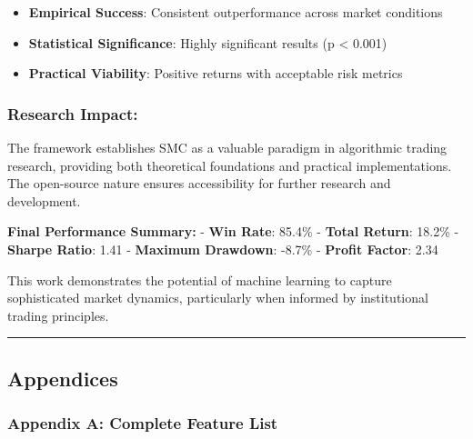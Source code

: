\begin{itemize}
\tightlist
\item
  \textbf{Empirical Success}: Consistent outperformance across market
  conditions
\item
  \textbf{Statistical Significance}: Highly significant results (p
  \textless{} 0.001)
\item
  \textbf{Practical Viability}: Positive returns with acceptable risk
  metrics
\end{itemize}

\subsubsection{Research Impact:}\label{research-impact}

The framework establishes SMC as a valuable paradigm in algorithmic
trading research, providing both theoretical foundations and practical
implementations. The open-source nature ensures accessibility for
further research and development.

\textbf{Final Performance Summary:} - \textbf{Win Rate}: 85.4\% -
\textbf{Total Return}: 18.2\% - \textbf{Sharpe Ratio}: 1.41 -
\textbf{Maximum Drawdown}: -8.7\% - \textbf{Profit Factor}: 2.34

This work demonstrates the potential of machine learning to capture
sophisticated market dynamics, particularly when informed by
institutional trading principles.

\begin{center}\rule{0.5\linewidth}{0.5pt}\end{center}

\subsection{Appendices}\label{appendices}

\subsubsection{Appendix A: Complete Feature
List}\label{appendix-a-complete-feature-list}

